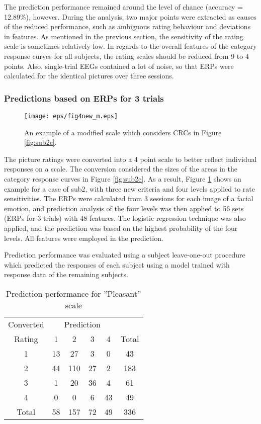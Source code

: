 \documentclass[fonts]{icst}
\begin{document}
The prediction performance remained around the level of chance (accuracy =
12.89\%), however. 
During the analysis, two major points were extracted as causes of the
reduced performance, such as ambiguous rating behaviour and deviations in 
features. 
As mentioned in the previous section, the sensitivity of the rating scale
is sometimes relatively low. In regards to the overall features of the
category response curves for all subjects, the rating scales should be
reduced from 9 to 4 points. 
Also, single-trial EEGs contained a lot of noise, so that ERPs were
calculated for the identical pictures over three sessions.

\subsubsection{Predictions based on ERPs for 3 trials}

\begin{figure}[tb]
   \begin{center}
    \texttt{[image: eps/fig4new\_m.eps]}
   \end{center}
  \caption{An example of a modified scale which considers CRCs in Figure \ref{fig:sub2c}.}
  \label{fig:sub2m}
\end{figure}

The picture ratings were converted into a 4 point scale to better
reflect individual responses on a scale. 
The conversion considered the sizes of the areas in the category response 
curves in Figure \ref{fig:sub2c}. 
As a result, Figure \ref{fig:sub2m} shows an
example for a case of sub2, with three new criteria and four levels
applied to rate sensitivities.  
The ERPs were calculated from 3 sessions for each image of a facial
emotion, and prediction analysis of the four levels was then applied to
56 sets (ERPs for 3 trials) with 48 features.  
The logistic regression technique was also applied, and the prediction
was based on the highest probability of the four levels. 
All features were employed in the prediction.

Prediction performance was evaluated using a subject leave-one-out
procedure which predicted the responses of each subject using
a model trained with response data of the remaining subjects.  

\begin{table}[tb]
  \begin{center}
     \caption{Prediction performance for ''Pleasant'' scale}
   \label{tbl:prd}
\small
\begin{tabular}{|c|c|c|c|c||c|}
\hline
Converted & \multicolumn{4}{c||}{Prediction} & \\
\cline{2-5}
Rating & 1 & 2 & 3 & 4 & Total \\
\hline \hline
1 & 13 & 27 & 3 & 0 &  43 \\ 
2 & 44 & 110 & 27 & 2 & 183\\
3 & 1 & 20 & 36 & 4 & 61 \\
4 & 0 & 0 & 6 & 43 & 49 \\ 
\hline
Total & 58 & 157 & 72 & 49 & 336 \\
\hline
\end{tabular}
\end{center}
\end{table}
\end{document}
